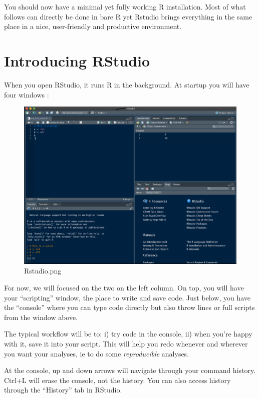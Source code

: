 \documentclass[
]{book}
\begin{document}
You should now have a minimal yet fully working R installation. Most of what follows can directly be done in bare R yet Rstudio brings everything in the same place in a nice, user-friendly and productive environment.

\hypertarget{introducing-rstudio}{%
\section{Introducing RStudio}\label{introducing-rstudio}}

When you open RStudio, it runs R in the background. At startup you will have four windows :

\begin{figure}
\centering
\includegraphics{Rstudio.png}
\caption{Rstudio.png}
\end{figure}

For now, we will focused on the two on the left column. On top, you will have your ``scripting'' window, the place to write and save code. Just below, you have the ``console'' where you can type code directly but also throw lines or full scripts from the window above.

The typical workflow will be to: i) try code in the console, ii) when you're happy with it, save it into your script. This will help you redo whenever and wherever you want your analyses, ie to do some \emph{reproducible} analyses.

At the console, up and down arrows will navigate through your command history. Ctrl+L will erase the console, not the history. You can also access history through the ``History'' tab in RStudio.
\end{document}
